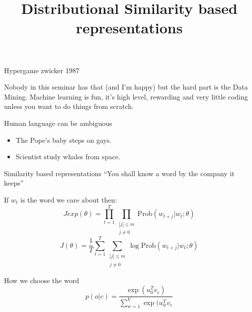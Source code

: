 \documentclass{beamer}
\newcommand{\Prob}{\text{Prob}}
\begin{document}
\begin{frame}
Hypergame zwicker 1987
\end{frame}

\begin{frame}
Nobody in this seminar has that (and I'm happy) but the hard part is the Data Mining.
Machine learning is fun, it's high level, rewarding and very little coding unless you want to do things from scratch.
\end{frame}

\begin{frame}
    Human language can be ambiguous
    \begin{itemize}
            \item The Pope's baby steps on gays.
            \item Scientist study whales from space.
    \end{itemize}
\end{frame}

\begin{frame}{Similarity based representations}
    ``You shall know a word by the company it keeps''\\[5mm]
    \hspace*{}

\end{frame}

\begin{frame}
    \title{Distributional Similarity based representations}
    If $w_t$ is the word we care about then:
    $$Jexp(\theta) = \prod_{t=1}^T \prod_{\substack{|j|\leq m\\ j\neq 0}} \Prob(w_{t+j}| w_t; \theta)$$
    $$J(\theta) = \frac 1T \sum_{t=1}^T \sum_{\substack{|j|\leq m\\ j\neq 0}}\log \Prob(w_{t+j}| w_t; \theta)$$
\end{frame}

\begin{frame}{How we  choose the word}
     $$p(o|c) = \frac{\exp(u_0^T v_c)}{\sum_{w=1}^V \exp(u_w^Tv_c}$$
\end{frame}
\end{document}
